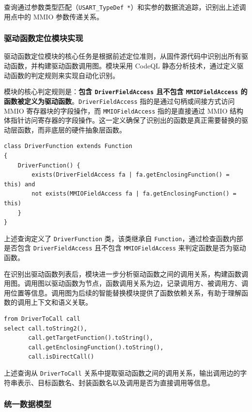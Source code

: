 查询通过参数类型匹配（\texttt{USART\_TypeDef *}）和实参的数据流追踪，识别出上述调用点中的 MMIO 参数传递关系。

\subsubsection{驱动函数定位模块实现}

驱动函数定位模块的核心任务是根据前述定位准则，从固件源代码中识别出所有驱动函数，并构建驱动函数调用图。模块采用 CodeQL 静态分析技术，通过定义驱动函数的判定规则来实现自动化识别。

模块的核心判定规则是：\textbf{包含 \texttt{DriverFieldAccess} 且不包含 \texttt{MMIOFieldAccess} 的函数被定义为驱动函数}。\texttt{DriverFieldAccess} 指的是通过句柄或间接方式访问 MMIO 寄存器块的字段操作，而 \texttt{MMIOFieldAccess} 指的是直接通过 MMIO 结构体指针访问寄存器的字段操作。这一定义确保了识别出的函数是真正需要替换的驱动层函数，而非底层的硬件抽象层函数。

\begin{lstlisting}[style=CodeQL,language=CodeQL, caption={驱动函数判定规则}]
class DriverFunction extends Function
{
    DriverFunction() {
        exists(DriverFieldAccess fa | fa.getEnclosingFunction() = this) and
        not exists(MMIOFieldAccess fa | fa.getEnclosingFunction() = this)
    }
}
\end{lstlisting}

上述查询定义了 \texttt{DriverFunction} 类，该类继承自 \texttt{Function}，通过检查函数内部是否包含 \texttt{DriverFieldAccess} 且不包含 \texttt{MMIOFieldAccess} 来判定函数是否为驱动函数。

在识别出驱动函数列表后，模块进一步分析驱动函数之间的调用关系，构建函数调用图。调用图以驱动函数为节点，函数调用关系为边，记录调用方、被调用方、调用位置等信息。调用图为后续的智能替换模块提供了函数依赖关系，有助于理解函数的调用上下文和语义关联。

\begin{lstlisting}[style=CodeQL,language=CodeQL, caption={驱动函数调用关系查询}]
from DriverToCall call
select call.toString2(),
       call.getTargetFunction().toString(),
       call.getEnclosingFunction().toString(),
       call.isDirectCall()
\end{lstlisting}

上述查询从 \texttt{DriverToCall} 关系中提取驱动函数之间的调用关系，输出调用边的字符串表示、目标函数名、封装函数名以及调用是否为直接调用等信息。

\subsubsection{统一数据模型}

